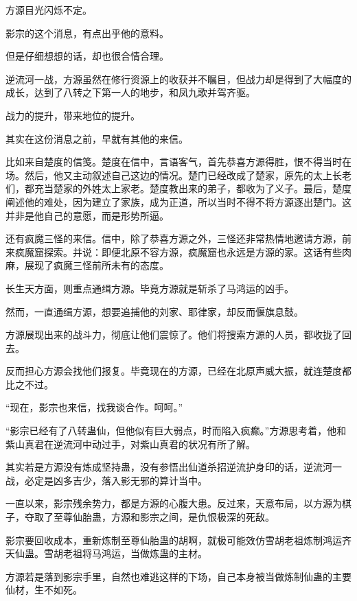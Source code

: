 
\begin{this_body}



方源目光闪烁不定。

影宗的这个消息，有点出乎他的意料。

但是仔细想想的话，却也很合情合理。

逆流河一战，方源虽然在修行资源上的收获并不瞩目，但战力却是得到了大幅度的成长，达到了八转之下第一人的地步，和凤九歌并驾齐驱。

战力的提升，带来地位的提升。

其实在这份消息之前，早就有其他的来信。

比如来自楚度的信笺。楚度在信中，言语客气，首先恭喜方源得胜，恨不得当时在场。然后，他又主动叙述自己这边的情况。楚门已经改成了楚家，原先的太上长老们，都充当楚家的外姓太上家老。楚度教出来的弟子，都收为了义子。最后，楚度阐述他的难处，因为建立了家族，成为正道，所以当时不得不将方源逐出楚门。这并非是他自己的意愿，而是形势所逼。

还有疯魔三怪的来信。信中，除了恭喜方源之外，三怪还非常热情地邀请方源，前来疯魔窟探索。并说：即便北原不容方源，疯魔窟也永远是方源的家。这话有些肉麻，展现了疯魔三怪前所未有的态度。

长生天方面，则重点通缉方源。毕竟方源就是斩杀了马鸿运的凶手。

然而，一直通缉方源，想要追捕他的刘家、耶律家，却反而偃旗息鼓。

方源展现出来的战斗力，彻底让他们震惊了。他们将搜索方源的人员，都收拢了回去。

反而担心方源会找他们报复。毕竟现在的方源，已经在北原声威大振，就连楚度都比之不过。

“现在，影宗也来信，找我谈合作。呵呵。”

“影宗已经有了八转蛊仙，但他似有巨大弱点，时而陷入疯癫。”方源思考着，他和紫山真君在逆流河中动过手，对紫山真君的状况有所了解。

其实若是方源没有炼成坚持蛊，没有参悟出仙道杀招逆流护身印的话，逆流河一战，必定是凶多吉少，落入影无邪的算计当中。

一直以来，影宗残余势力，都是方源的心腹大患。反过来，天意布局，以方源为棋子，夺取了至尊仙胎蛊，方源和影宗之间，是仇恨极深的死敌。

影宗要回收成本，重新炼制至尊仙胎蛊的胡啊，就极可能效仿雪胡老祖炼制鸿运齐天仙蛊。雪胡老祖将马鸿运，当做炼蛊的主材。

方源若是落到影宗手里，自然也难逃这样的下场，自己本身被当做炼制仙蛊的主要仙材，生不如死。


\end{this_body}
